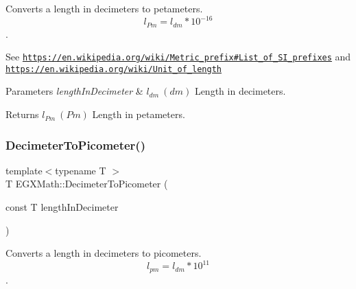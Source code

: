 Converts a length in decimeters to petameters. \[ l_{Pm}=l_{dm} * 10^{-16} \]. 

See \href{https://en.wikipedia.org/wiki/Metric_prefix#List_of_SI_prefixes}{\tt https\+://en.\+wikipedia.\+org/wiki/\+Metric\+\_\+prefix\#\+List\+\_\+of\+\_\+\+S\+I\+\_\+prefixes} and \href{https://en.wikipedia.org/wiki/Unit_of_length}{\tt https\+://en.\+wikipedia.\+org/wiki/\+Unit\+\_\+of\+\_\+length} 
\begin{DoxyParams}{Parameters}
{\em length\+In\+Decimeter} & $ l_{dm}\ (dm)$ Length in decimeters. \\
\hline
\end{DoxyParams}
\begin{DoxyReturn}{Returns}
$ l_{Pm}\ (Pm)$ Length in petameters. 
\end{DoxyReturn}
\mbox{\label{group___e_g_x_math-_conversions-_length_conversions-_decimeter-_s_i_gaac5fa4b7b538abe2d19f33e131e9bbde}} 
\subsubsection{\texorpdfstring{Decimeter\+To\+Picometer()}{DecimeterToPicometer()}}
{\footnotesize\ttfamily template$<$typename T $>$ \\
T E\+G\+X\+Math\+::\+Decimeter\+To\+Picometer (\begin{DoxyParamCaption}\item[{const T}]{length\+In\+Decimeter }\end{DoxyParamCaption})}



Converts a length in decimeters to picometers. \[ l_{pm}=l_{dm} * 10^{11} \]. 

